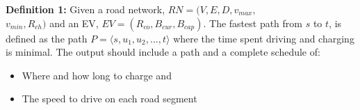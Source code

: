 \textbf{Definition 1:} Given a road network, $RN=(V,E,D,v_{max},$\\ 
$v_{min},R_{ch})$ and an EV, $EV=(R_{co},B_{cur},B_{cap})$. The fastest path 
from $s$ to $t$, is defined as the path $P = \langle s,u_1,u_2,\dots,t \rangle$ where the time spent driving and charging is minimal. 
The output should include a path and a complete schedule of:
\begin{itemize}
\item Where and how long to charge and
\item The speed to drive on each road segment
\end{itemize}



